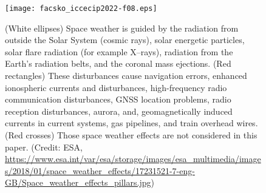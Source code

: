 \documentclass[sn-aps]{sn-jnl}%
\begin{document}

\begin{figure}[!t]
\centering
\texttt{[image: facsko\_iccecip2022-f08.eps]}
\caption{(White ellipses) Space weather is guided by the radiation from outside the Solar System (cosmic rays), solar energetic particles, solar flare radiation (for example X--rays), radiation from the Earth's radiation belts, and the coronal mass ejections. (Red rectangles) These disturbances cause navigation errors, enhanced ionospheric currents and disturbances, high-frequency radio communication disturbances, GNSS location problems, radio reception disturbances, aurora, and, geomagnetically induced currents in current systems, gas pipelines, and train overhead wires. (Red crosses) Those space weather effects are not considered in this paper. (Credit: ESA, \url{https://www.esa.int/var/esa/storage/images/esa_multimedia/images/2018/01/space_weather_effects/17231521-7-eng-GB/Space_weather_effects_pillars.jpg})} \label{fig:sweffects}
\end{figure}
\end{document}
